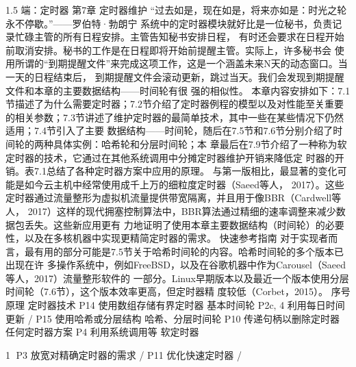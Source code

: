 
1.5 端：定时器
第7章 定时器维护
“过去如是，现在如是，将来亦如是：时光之轮永不停歇。”——罗伯特·勃朗宁
系统中的定时器模块就好比是一位秘书，负责记录忙碌主管的所有日程安排。主管告知秘书安排日程，
有时还会要求在日程开始前取消安排。秘书的工作是在日程即将开始前提醒主管。实际上，许多秘书会
使用所谓的“到期提醒文件”来完成这项工作，这是一个涵盖未来N天的动态窗口。当一天的日程结束后，
到期提醒文件会滚动更新，跳过当天。我们会发现到期提醒文件和本章的主要数据结构——时间轮有很
强的相似性。
本章内容安排如下：7.1节描述了为什么需要定时器；7.2节介绍了定时器例程的模型以及对性能至关重要
的相关参数；7.3节讲述了维护定时器的最简单技术，其中一些在某些情况下仍然适用；7.4节引入了主要
数据结构——时间轮，随后在7.5节和7.6节分别介绍了时间轮的两种具体实例：哈希轮和分层时间轮；本
章最后在7.9节介绍了一种称为软定时器的技术，它通过在其他系统调用中分摊定时器维护开销来降低定
时器的开销。表7.1总结了各种定时器方案中应用的原理。
与第一版相比，最显著的变化可能是如今云主机中经常使用成千上万的细粒度定时器（Saeed等人，
2017）。这些定时器通过流量整形为虚拟机流量提供带宽隔离，并且用于像BBR（Cardwell等人，
2017）这样的现代拥塞控制算法中，BBR算法通过精细的速率调整来减少数据包丢失。这些新应用更有
力地证明了使用本章主要数据结构（时间轮）的必要性，以及在多核机器中实现更精简定时器的需求。
快速参考指南
对于实现者而言，最有用的部分可能是7.5节关于哈希时间轮的内容。哈希时间轮的多个版本已出现在许
多操作系统中，例如FreeBSD，以及在谷歌机器中作为Carousel（Saeed等人，2017）流量整形软件的
一部分。Linux早期版本以及最近一个版本使用分层时间轮（7.6节），这个版本效率更高，但定时器精
度较低（Corbet，2015）。
 序号                原理                   定时器技术
 P14               使用数组存储有界定时器          基本时间轮
 P2c, 4            利用每日时间更新             /
 P15               使用哈希或分层结构            哈希、分层时间轮
 P10               传递句柄以删除定时器           任何定时器方案
 P4                利用系统调用等              软定时器

                                                       1
P3                 放宽对精确定时器的需求       /
P11                优化快速定时器           /

